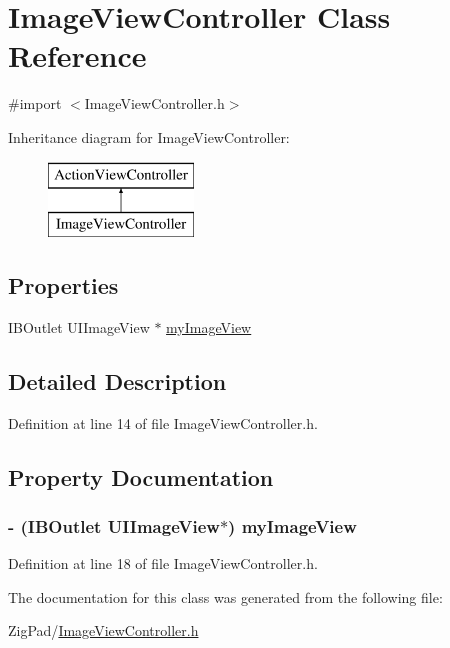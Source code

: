 \hypertarget{interface_image_view_controller}{
\section{ImageViewController Class Reference}
\label{interface_image_view_controller}
}


{\ttfamily \#import $<$ImageViewController.h$>$}

Inheritance diagram for ImageViewController:\begin{figure}[H]
\begin{center}
\leavevmode
\includegraphics[height=2.000000cm]{interface_image_view_controller}
\end{center}
\end{figure}
\subsection*{Properties}
\begin{DoxyCompactItemize}
\item 
IBOutlet UIImageView $\ast$ \hyperlink{interface_image_view_controller_ac5b740a1f98d442ea89d96b69ffc9ebf}{myImageView}
\end{DoxyCompactItemize}


\subsection{Detailed Description}


Definition at line 14 of file ImageViewController.h.



\subsection{Property Documentation}
\hypertarget{interface_image_view_controller_ac5b740a1f98d442ea89d96b69ffc9ebf}{
\subsubsection[{myImageView}]{\setlength{\rightskip}{0pt plus 5cm}-\/ (IBOutlet UIImageView$\ast$) myImageView}}
\label{interface_image_view_controller_ac5b740a1f98d442ea89d96b69ffc9ebf}


Definition at line 18 of file ImageViewController.h.



The documentation for this class was generated from the following file:\begin{DoxyCompactItemize}
\item 
ZigPad/\hyperlink{_image_view_controller_8h}{ImageViewController.h}\end{DoxyCompactItemize}
